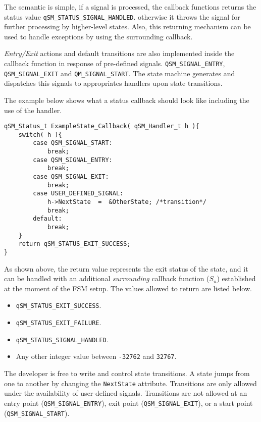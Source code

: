 The semantic is simple, if a signal is processed, the callback functions returns the status value \lstinline{qSM_STATUS_SIGNAL_HANDLED}. otherwise it throws the signal for further processing by higher-level states. Also, this returning mechanism can be used to handle exceptions by using the surrounding callback.

\textit{Entry/Exit} actions and default transitions are also implemented inside the callback function in response of pre-defined signals. \lstinline{QSM_SIGNAL_ENTRY}, \lstinline{QSM_SIGNAL_EXIT} and \lstinline{QM_SIGNAL_START}.
The state machine generates and dispatches this signals to appropriates handlers upon state transitions.

The example below shows what a status callback should look like including the use of the handler.
\medskip

\begin{lstlisting}[style=CStyle]
qSM_Status_t ExampleState_Callback( qSM_Handler_t h ){
    switch( h ){
        case QSM_SIGNAL_START:
            break;
        case QSM_SIGNAL_ENTRY:
            break;
        case QSM_SIGNAL_EXIT:
            break;
        case USER_DEFINED_SIGNAL:
            h->NextState  =  &OtherState; /*transition*/
            break;
        default:
            break;
    }
    return qSM_STATUS_EXIT_SUCCESS;
}
\end{lstlisting} 

As shown above, the return value represents the exit status of the state, and it can be handled with an additional \textit{surrounding} callback function ($S_u$) established at the moment of the FSM setup. The values allowed to return are listed below.

\begin{itemize}
    \item \lstinline{qSM_STATUS_EXIT_SUCCESS}.
    \item \lstinline{qSM_STATUS_EXIT_FAILURE}.
    \item \lstinline{qSM_STATUS_SIGNAL_HANDLED}.
    \item Any other integer value between \lstinline{-32762} and \lstinline{32767}.
\end{itemize} 

The developer is free to write and control state transitions. A state jumps from one to another by changing the \lstinline{NextState} attribute. Transitions are only allowed under the availability of user-defined signals. Transitions are not allowed at an entry point (\lstinline{QSM_SIGNAL_ENTRY}), exit point (\lstinline{QSM_SIGNAL_EXIT}), or a start point (\lstinline{QSM_SIGNAL_START}).


